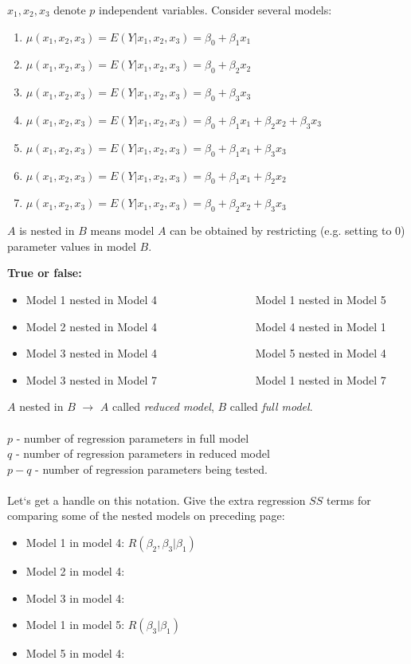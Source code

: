 $x_1,x_2,x_3$ denote $p$ independent variables.  Consider
several models:
\begin{enumerate}
\item $\mu(x_1,x_2,x_3) = E(Y|x_1,x_2,x_3) =  \beta_0 + \beta_1 x_1$
\item $\mu(x_1,x_2,x_3) = E(Y|x_1,x_2,x_3) =  \beta_0 + \beta_2 x_2$
\item $\mu(x_1,x_2,x_3) = E(Y|x_1,x_2,x_3) =  \beta_0 + \beta_3 x_3$
\item $\mu(x_1,x_2,x_3) = E(Y|x_1,x_2,x_3) =  \beta_0 + \beta_1 x_1 + \beta_2 x_2 + \beta_3 x_3$
\item $\mu(x_1,x_2,x_3) = E(Y|x_1,x_2,x_3) =  \beta_0 + \beta_1 x_1 + \beta_3 x_3$
\item $\mu(x_1,x_2,x_3) = E(Y|x_1,x_2,x_3) =  \beta_0 + \beta_1 x_1 + \beta_2 x_2$
\item $\mu(x_1,x_2,x_3) = E(Y|x_1,x_2,x_3) =  \beta_0 + \beta_2 x_2 + \beta_3 x_3$
\end{enumerate}
$A$ is nested in $B$ means model $A$ can be obtained by restricting (e.g. setting to 0) parameter values in model $B$.

\textbf{True or false:}
\begin{itemize}
\item Model 1 nested in Model 4 ~~~~~~~~~~~~~~~~~Model 1 nested in Model 5
\item Model 2 nested in Model 4 ~~~~~~~~~~~~~~~~~Model 4 nested in Model 1
\item Model 3 nested in Model 4 ~~~~~~~~~~~~~~~~~Model 5 nested in Model 4
\item Model 3 nested in Model 7 ~~~~~~~~~~~~~~~~~Model 1 nested in Model 7
\end{itemize}

$A$ nested in $B$ $\longrightarrow$ $A$ called {\em reduced model}, $B$ called {\em full model}.  \\~\\

$p$ - number of regression parameters in full model  \\
$q$ - number of regression parameters in reduced model \\
$p-q$ - number of regression parameters being tested. \\~\\

Let`s get a handle on this notation.  Give the extra regression $SS$ terms for comparing some of the nested models on preceding page:
\begin{itemize}
\item Model 1 in model 4: $R(\beta_2,\beta_3|\beta_1)$
\item Model 2 in model 4:  
\item Model 3 in model 4:  
\item Model 1 in model 5: $R(\beta_3|\beta_1) $
\item Model 5 in model 4:
\end{itemize}


